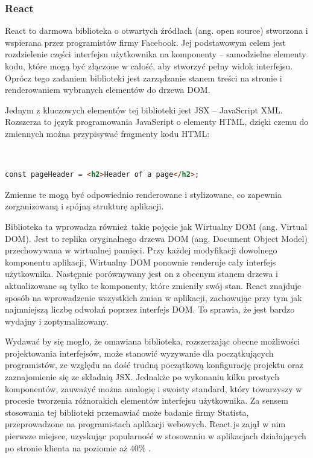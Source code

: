 \documentclass[12pt,twoside]{article}
\begin{document}
\subsubsection{React}

React to darmowa biblioteka o otwartych źródłach (ang. open source) stworzona i wspierana przez programistów firmy Facebook. Jej podstawowym celem jest rozdzielenie części interfejsu użytkownika na komponenty -- samodzielne elementy kodu, które mogą być złączone w całość, aby stworzyć pełny widok interfejsu. Oprócz tego zadaniem biblioteki jest zarządzanie stanem treści na stronie i renderowaniem wybranych elementów do drzewa DOM. 

Jednym z kluczowych elementów tej biblioteki jest JSX -- JavaScript XML. Rozszerza to język programowania JavaScript o elementy HTML, dzięki czemu do zmiennych można przypisywać fragmenty kodu HTML:

\

\begin{lstlisting}[language=HTML,caption=Nagłówek strony w wykonany w składni JSX,label={KodJS}]
	const pageHeader = <h2>Header of a page</h2>;
\end{lstlisting}

Zmienne te mogą być odpowiednio renderowane i stylizowane, co zapewnia zorganizowaną i spójną strukturę aplikacji.

Biblioteka ta wprowadza również takie pojęcie jak Wirtualny DOM (ang. Virtual DOM). Jest to replika oryginalnego drzewa DOM (ang. Document Object Model) przechowywana w wirtualnej pamięci. Przy każdej modyfikacji dowolnego komponentu aplikacji, Wirtualny DOM ponownie renderuje cały interfejs użytkownika. Następnie porównywany jest on z obecnym stanem drzewa i aktualizowane są tylko te komponenty, które zmieniły swój stan. React znajduje sposób na wprowadzenie wszystkich zmian w aplikacji, zachowując przy tym jak najmniejszą liczbę odwołań poprzez interfejs DOM. To sprawia, że jest bardzo wydajny i zoptymalizowany.

Wydawać by się mogło, że omawiana biblioteka, rozszerzając obecne możliwości projektowania interfejsów, może stanowić wyzywanie dla początkujących programistów, ze względu na dość trudną początkową konfigurację projektu oraz zaznajomienie się ze składnią JSX. Jednakże po wykonaniu kilku prostych komponentów, zauważyć można analogię i swoisty standard, który towarzyszy w procesie tworzenia różnorakich elementów interfejsu użytkownika. Za sensem stosowania tej biblioteki przemawiać może badanie firmy Statista, przeprowadzone na programistach aplikacji webowych. React.js zajął w nim pierwsze miejsce, uzyskując popularność w stosowaniu w aplikacjach działających po stronie klienta na poziomie aż 40\% \cite{ReactPopular}.
\end{document}
